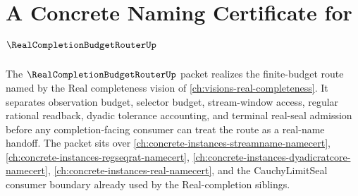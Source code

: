 \chapter{A Concrete Naming Certificate for $\RealCompletionBudgetRouterUp$}
\label{ch:concrete-instances-real-completion-budget-router-namecert}

The $\RealCompletionBudgetRouterUp$ packet realizes the finite-budget route named by the Real completeness vision of \autoref{ch:visions-real-completeness}. It separates observation budget, selector budget, stream-window access, regular rational readback, dyadic tolerance accounting, and terminal real-seal admission before any completion-facing consumer can treat the route as a real-name handoff. The packet sits over \autoref{ch:concrete-instances-streamname-namecert}, \autoref{ch:concrete-instances-regseqrat-namecert}, \autoref{ch:concrete-instances-dyadicratcore-namecert}, \autoref{ch:concrete-instances-real-namecert}, and the CauchyLimitSeal consumer boundary already used by the Real-completion siblings.

